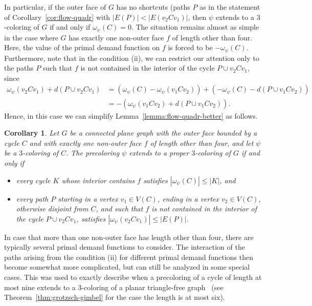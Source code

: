 \documentclass[12pt,twoside,openright,a4paper]{book}
\newtheorem{corollary}[theorem]{Corollary}
\begin{document}
In particular, if the outer face of $G$ has no shortcuts (paths $P$ as in the statement of Corollary~\ref{cor:flow-quadr}
with $|E(P)|<|E(v_2Cv_1)|$, then $\psi$ extends to a $3$-coloring of $G$ if and only if $\omega_\psi(C)=0$.
The situation remains almost as simple in the case where $G$ has exactly one non-outer face $f$ of length other than four.
Here, the value of the primal demand function on $f$ is forced to be $-\omega_\psi(C)$.
Furthermore, note that in the condition (ii), we can restrict our attention only to the paths $P$ such that
$f$ is not contained in the interior of the cycle $P\cup v_2Cv_1$, since
\begin{align*}
\omega_\psi(v_2Cv_1)+d(P\cup v_2Cv_1)&=(\omega_\psi(C)-\omega_\psi(v_1Cv_2))+(-\omega_\psi(C)-d(P\cup v_1Cv_2))\\
&=-(\omega_\psi(v_1Cv_2)+d(P\cup v_1Cv_2)).
\end{align*}
Hence, in this case we can simplify Lemma~\ref{lemma:flow-quadr-better} as follows.
\begin{corollary}\label{cor:flow-oneface}
Let $G$ be a connected plane graph with the outer face bounded by a cycle $C$ and with exactly one non-outer face $f$ of length other than four,
and let $\psi$ be a $3$-coloring of $C$.
The precoloring $\psi$ extends to a proper $3$-coloring of $G$ if and only if
\begin{itemize}
\item[(i)] every cycle $K$ whose interior contains $f$ satisfies $|\omega_\psi(C)|\le |K|$, and
\item[(ii)] every path $P$ starting in a vertex $v_1\in V(C)$, ending in a vertex $v_2\in V(C)$,
otherwise disjoint from $C$, and such that $f$ is not contained in the interior of the cycle $P\cup v_2Cv_1$,
satisfies $|\omega_\psi(v_2Cv_1)|\le |E(P)|$.
\end{itemize}
\end{corollary}

In case that more than one non-outer face has length other than four, there are typically several primal demand functions
to consider.  The interaction of the paths arising from the condition (ii) for different primal demand functions then become
somewhat more complicated, but can still be analyzed in some special cases.  This was used to exactly describe when a precoloring
of a cycle of length at most nine extends to a $3$-coloring of a planar triangle-free graph~\cite{col8cyc,col9cyc} (see Theorem~\ref{thm:grotzsch-gimbel}
for the case the length is at most six).
\end{document}
